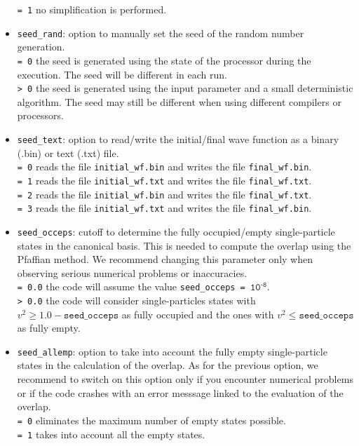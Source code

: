 \documentclass[a4paper,11pt]{article}
\newcommand{\ttt}[1]{\texttt{#1}}
\begin{document}
\begin{itemize}
 \ttt{= 1\:} no simplification is performed.
\item \ttt{seed\_rand}: option to manually set the seed of the random number generation. \\[0.05cm]
 \ttt{= 0\:} the seed is generated using the state of the processor during the execution. The seed will be different in each run. \\[0.05cm]
 \ttt{> 0\:} the seed is generated using the input parameter and a small deterministic algorithm. The seed may still be different when using different compilers or processors. 
\item \ttt{seed\_text}: option to read/write the initial/final wave function as a binary (.bin) or text (.txt) file. \\[0.05cm]
 \ttt{= 0\:} reads the file \ttt{initial\_wf.bin} and writes the file \ttt{final\_wf.bin}. \\[0.05cm]
 \ttt{= 1\:} reads the file \ttt{initial\_wf.txt} and writes the file \ttt{final\_wf.txt}. \\[0.05cm]
 \ttt{= 2\:} reads the file \ttt{initial\_wf.bin} and writes the file \ttt{final\_wf.txt}. \\[0.05cm]
 \ttt{= 3\:} reads the file \ttt{initial\_wf.txt} and writes the file \ttt{final\_wf.bin}. 
\item \ttt{seed\_occeps}: cutoff to determine the fully occupied/empty single-particle states in the canonical basis. 
 This is needed to compute the overlap using the Pfaffian method. We recommend changing this parameter only when observing
 serious numerical problems or inaccuracies. \\[0.05cm]
 \ttt{= 0.0\:} the code will assume the value \ttt{seed\_occeps = ${\ttt{10}}^{\ttt{-8}}$}. \\[0.05cm]
 \ttt{> 0.0\:} the code will consider single-particles states with $v^2 \ge 1.0 - \ttt{seed\_occeps}$ as fully occupied and 
 the ones with $v^2 \le \ttt{seed\_occeps}$ as fully empty. 
\item \ttt{seed\_allemp}: option to take into account the fully empty single-particle states in the calculation of the overlap. As for the previous option, we recommend to switch on this 
 option only if you encounter numerical problems or if the code crashes with an error messsage linked to the evaluation of the overlap. \\[0.05cm]
 \ttt{= 0\:} eliminates the maximum number of empty states possible. \\[0.05cm]
 \ttt{= 1\:} takes into account all the empty states.

\end{itemize}
\end{document}
